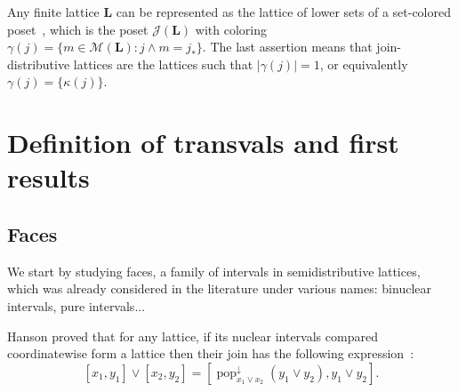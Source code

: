 \documentclass[leqno, 12pt]{amsart}
\numberwithin{equation}{section}
\renewcommand{\L}{\mathbf L}
\newcommand{\JIrr}{\mathcal J}
\newcommand{\MIrr}{\mathcal M}
\newcommand{\popdown}{\operatorname{pop}^\downarrow}
\numberwithin{equation}{section}
\theoremstyle{remark}
\begin{document}
Any finite lattice $\L$ can be represented as the lattice of lower sets of a set-colored poset~\cite{HaNo18}, which is the poset $\JIrr(\L)$ with coloring $\gamma(j)=\{m\in \MIrr(\L): j\wedge m=j_*\}$. The last assertion means that join-distributive lattices are the lattices such that $|\gamma(j)|=1$, or equivalently $\gamma(j)=\{\kappa(j)\}$.
	
	\section{Definition of transvals and first results}

\subsection{Faces}

We start by studying faces, a family of intervals in semidistributive lattices, which was already considered in the literature under various names: binuclear intervals, pure intervals...

Hanson proved that for any lattice, if its nuclear intervals compared coordinatewise form a lattice then their join has the following expression~\cite{Hans24}: $$[x_1,y_1]\vee[x_2,y_2]=\left[\popdown_{x_1\vee x_2} (y_1\vee y_2), y_1\vee y_2\right].$$
\end{document}
